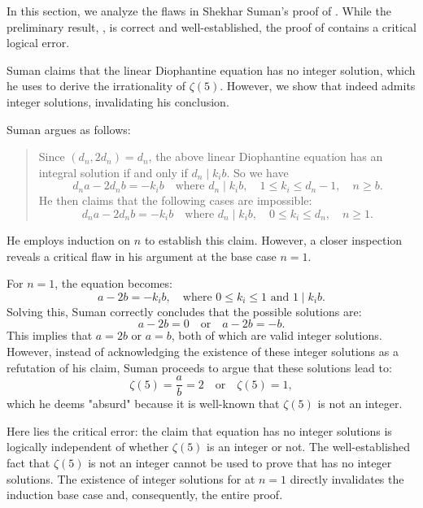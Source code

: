 \documentclass[12pt,reqno]{amsart}
\theoremstyle{definition}
\numberwithin{equation}{section}
\begin{document}
In this section, we analyze the flaws in Shekhar Suman's proof of \cite[Theorem 1]{Suman2024}. While the preliminary result, \cite[Lemma 1]{Suman2024}, is correct and well-established, the proof of \cite[Theorem 1]{Suman2024} contains a critical logical error.

Suman claims that the linear Diophantine equation \cite[Eq. (47)]{Suman2024} has no integer solution, which he uses to derive the irrationality of \(\zeta(5)\). However, we show that \cite[Eq. (47)]{Suman2024} indeed admits integer solutions, invalidating his conclusion.

Suman argues as follows:
\begin{quote}
Since \((d_n, 2d_n) = d_n\), the above linear Diophantine equation has an integral solution if and only if \(d_n \mid k_i b\). So we have
\[
d_n a - 2d_n b = -k_i b \quad \text{where } d_n \mid k_i b, \quad 1 \leq k_i \leq d_n - 1, \quad n \geq b.
\]
He then claims that the following cases are impossible:
\[
d_n a - 2d_n b = -k_i b \quad \text{where } d_n \mid k_i b, \quad 0 \leq k_i \leq d_n, \quad n \geq 1.
\]
\end{quote}

He employs induction on \(n\) to establish this claim. However, a closer inspection reveals a critical flaw in his argument at the base case \(n=1\).

For \(n=1\), the equation becomes:
\[
a - 2b = -k_i b, \quad \text{where } 0 \leq k_i \leq 1 \text{ and } 1 \mid k_i b.
\]
Solving this, Suman correctly concludes that the possible solutions are:
\[
a - 2b = 0 \quad \text{or} \quad a - 2b = -b.
\]
This implies that \(a = 2b\) or \(a = b\), both of which are valid integer solutions. However, instead of acknowledging the existence of these integer solutions as a refutation of his claim, Suman proceeds to argue that these solutions lead to:
\[
\zeta(5) = \frac{a}{b} = 2 \quad \text{or} \quad \zeta(5) = 1,
\]
which he deems "absurd" because it is well-known that \(\zeta(5)\) is not an integer.

Here lies the critical error: the claim that equation \cite[Eq. (48)]{Suman2024} has no integer solutions is logically independent of whether \(\zeta(5)\) is an integer or not. The well-established fact that \(\zeta(5)\) is not an integer cannot be used to prove that \cite[Eq. (48)]{Suman2024} has no integer solutions. The existence of integer solutions for \cite[Eq. (48)]{Suman2024} at \(n=1\) directly invalidates the induction base case and, consequently, the entire proof.
\end{document}
